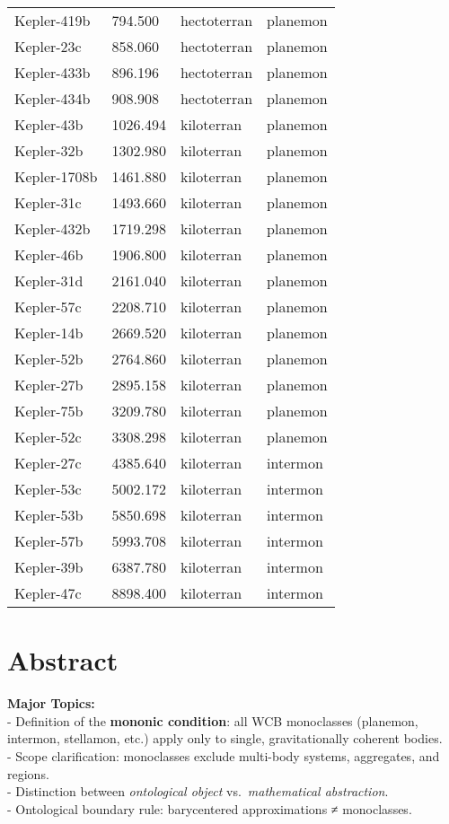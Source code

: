 \documentclass[
  letterpaper,
]{book}
\begin{document}
\begin{longtable}[]{@{}llll@{}}
Kepler-419b & 794.500 & hectoterran & planemon \\
Kepler-23c & 858.060 & hectoterran & planemon \\
Kepler-433b & 896.196 & hectoterran & planemon \\
Kepler-434b & 908.908 & hectoterran & planemon \\
Kepler-43b & 1026.494 & kiloterran & planemon \\
Kepler-32b & 1302.980 & kiloterran & planemon \\
Kepler-1708b & 1461.880 & kiloterran & planemon \\
Kepler-31c & 1493.660 & kiloterran & planemon \\
Kepler-432b & 1719.298 & kiloterran & planemon \\
Kepler-46b & 1906.800 & kiloterran & planemon \\
Kepler-31d & 2161.040 & kiloterran & planemon \\
Kepler-57c & 2208.710 & kiloterran & planemon \\
Kepler-14b & 2669.520 & kiloterran & planemon \\
Kepler-52b & 2764.860 & kiloterran & planemon \\
Kepler-27b & 2895.158 & kiloterran & planemon \\
Kepler-75b & 3209.780 & kiloterran & planemon \\
Kepler-52c & 3308.298 & kiloterran & planemon \\
Kepler-27c & 4385.640 & kiloterran & intermon \\
Kepler-53c & 5002.172 & kiloterran & intermon \\
Kepler-53b & 5850.698 & kiloterran & intermon \\
Kepler-57b & 5993.708 & kiloterran & intermon \\
Kepler-39b & 6387.780 & kiloterran & intermon \\
Kepler-47c & 8898.400 & kiloterran & intermon \\
\end{longtable}

\section{Abstract}\label{abstract-38}

\textbf{Major Topics:}\\
- Definition of the \textbf{mononic condition}: all WCB monoclasses
(planemon, intermon, stellamon, etc.) apply only to single,
gravitationally coherent bodies.\\
- Scope clarification: monoclasses exclude multi-body systems,
aggregates, and regions.\\
- Distinction between \emph{ontological object} vs.~\emph{mathematical
abstraction}.\\
- Ontological boundary rule: barycentered approximations ≠ monoclasses.
\end{document}

